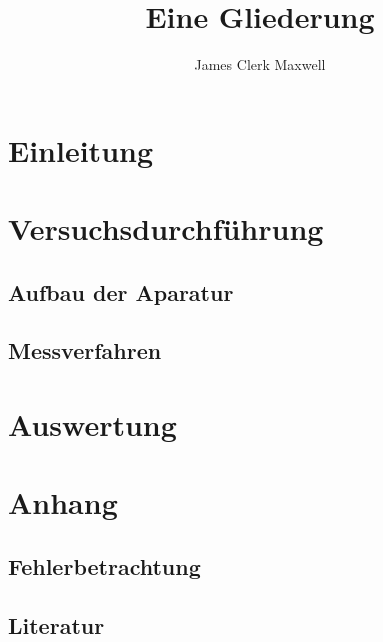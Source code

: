 \documentclass[a4paper,10pt]{book}
\title{Eine Gliederung}
\author{James Clerk Maxwell}
\begin{document}
   \maketitle
   \tableofcontents

    \chapter{Einleitung}
    \chapter{Versuchsdurchführung}
    \section{Aufbau der Aparatur}
    \section{Messverfahren}
    \chapter{Auswertung}
    \chapter{Anhang}
    \section{Fehlerbetrachtung}
    \section{Literatur}
\end{document}
